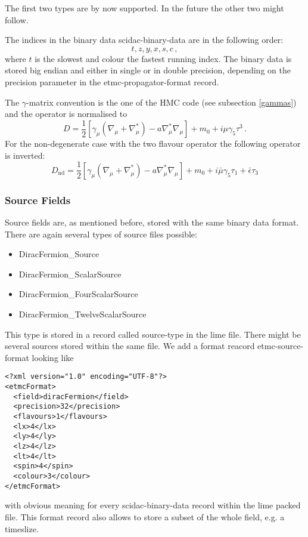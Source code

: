 The first two types are by now supported. In the future the other two
might follow.

The indices in the binary data {\ttfamily scidac-binary-data} are in
the following order:
\[
t, z, y, x, s, c\, ,
\]
where $t$ is the slowest and colour the fastest running index.
The binary data is stored big endian and either in single or in double
precision, depending on the {\ttfamily precision} parameter in the
{\ttfamily etmc-propagator-format} record. 

The $\gamma$-matrix convention is the one of the HMC code (see
subsection \ref{gammas}) and the operator is normalised to
\[
D =
\frac{1}{2}[\gamma_\mu(\nabla_\mu+\nabla_\mu^*)-a\nabla_\mu^*\nabla_\mu]
+ m_0 + i \mu\gamma_5\tau^3\, .
\]
For the non-degenerate case with the two flavour operator the
following operator is inverted:
\[
D_\mathrm{nd} =
\frac{1}{2}[\gamma_\mu(\nabla_\mu+\nabla_\mu^*)-a\nabla_\mu^*\nabla_\mu]
+ m_0 + i\bar\mu\gamma_5\tau_1+\bar\epsilon\tau_3
\]

\subsubsection{Source Fields}

Source fields are, as mentioned before, stored with the same binary
data format. There are again several types of source files possible:
\begin{itemize}
\item {\ttfamily DiracFermion\_Source}
\item {\ttfamily DiracFermion\_ScalarSource}
\item {\ttfamily DiracFermion\_FourScalarSource}
\item {\ttfamily DiracFermion\_TwelveScalarSource}
\end{itemize}
This type is stored in a record called {\ttfamily source-type} in the
lime file. There might be several sources stored within the same
file. We add a format reacord {\ttfamily etmc-source-format} looking like
\begin{verbatim}
<?xml version="1.0" encoding="UTF-8"?>
<etmcFormat>
  <field>diracFermion</field>
  <precision>32</precision>
  <flavours>1</flavours>
  <lx>4</lx>
  <ly>4</ly>
  <lz>4</lz>
  <lt>4</lt>
  <spin>4</spin>
  <colour>3</colour>
</etmcFormat>
\end{verbatim}
with obvious meaning for every {\ttfamily scidac-binary-data} record
within the lime packed file. This format record also allows to store a
subset of the whole field, e.g. a timeslize.

